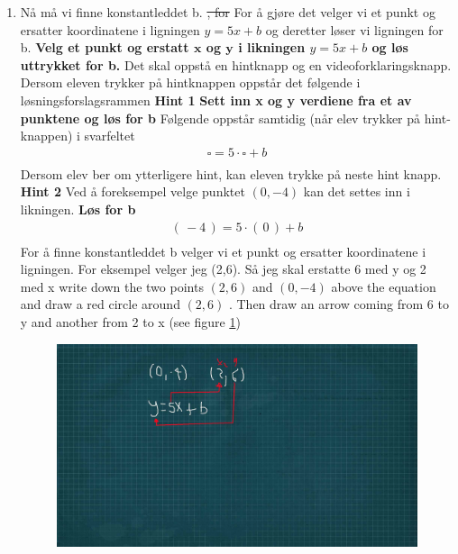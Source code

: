 \documentclass[12pt,twoside,onecolumn]{article}
\begin{document}
\begin{Exercise}
\begin{enumerate}
\item Nå må vi finne konstantleddet b. \st{, for} For å gjøre det velger vi et punkt og ersatter koordinatene i ligningen $y=5x+b$ og deretter løser vi ligningen for b. 
\newline
\textbf{Velg et punkt og erstatt $\mathbf{x}$ og $\mathbf{y}$ i likningen $y=5x+b$ og løs uttrykket for b.}
\newline
{\color{Maroon} Det skal oppstå en hintknapp og en videoforklaringsknapp. Dersom eleven trykker på hintknappen oppstår det følgende i løsningsforslagsrammen}
\newline
\newline
\textbf{Hint 1}
\newline
\textbf{Sett inn x og y verdiene fra et av punktene og løs for b }
{\color{Maroon} Følgende oppstår samtidig (når elev trykker på hint-knappen) i svarfeltet}
\begin{align}
\square = 5\cdot\square + b\\
\end{align}
{\color{Maroon} Dersom elev ber om ytterligere hint, kan eleven trykke på neste hint knapp.}
\newline
\newline
\textbf{Hint 2}
\newline
Ved å foreksempel velge punktet $(0,-4)$ kan det settes inn i likningen.
\newline
\textbf{ Løs for b}
\begin{align}
(\, -4 \, ) = 5\cdot (\, 0 \, ) + b \\
\end{align}
{\color{gray}For å  finne konstantleddet b  velger vi et punkt og ersatter koordinatene i ligningen. For eksempel velger jeg (2,6). Så jeg skal erstatte 6 med y og 2 med x} \newline
{\color{PineGreen} write down the two points  $(2,6)$  and  $(0,-4 )$ above the equation and draw a red circle around $(2,6)$ . Then draw an arrow coming from 6 to y and another from 2 to x (see figure \ref{fig:Opp11S4})}
\begin{figure}[h!]
\label{fig:Opp11S4}
\centering
\includegraphics[scale = 1.3]{figures/Opp11S4.jpg}

\end{figure}
\end{enumerate}
\end{Exercise}
\end{document}
